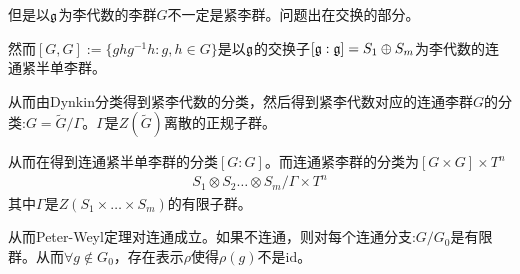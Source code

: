     但是以$\mathfrak{g}$为李代数的李群$G$不一定是紧李群。问题出在交换的部分。

    然而$[G,G]:=\{ghg^{-1}h:g,h \in G\}$是以$\mathfrak{g}$的交换子$[\mathfrak{g}:\mathfrak{g}]=S_1\oplus S_m$为李代数的连通紧半单李群。

    从而由Dynkin分类得到紧李代数的分类，然后得到紧李代数对应的连通李群$G$的分类:$G=\tilde{G}/\Gamma$。$\Gamma$是$Z(\tilde{G})$离散的正规子群。

    从而在得到连通紧半单李群的分类$[G:G]$。而连通紧李群的分类为$[G \times G] \times T^n$
    \begin{align*}
        S_1 \otimes S_2 \dots \otimes S_m/\Gamma \times T^n
    \end{align*}
    其中$\Gamma$是$Z(S_1\times \dots \times S_m)$的有限子群。

    从而Peter-Weyl定理对连通成立。如果不连通，则对每个连通分支:$G/G_0$是有限群。从而$\forall g \notin G_0$，存在表示$\rho$使得$\rho(g)$不是$\mathrm{id}$。

\ifx\allfiles\undefined
	
	
	
	
	\else
	\fi